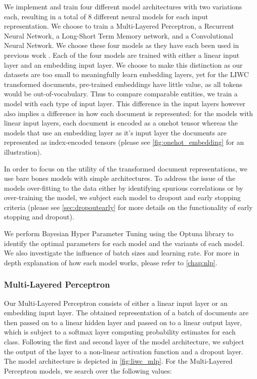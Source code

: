 We implement and train four different model architectures with two variations each, resulting in a total of 8 different neural models for each input representation. We choose to train a Multi-Layered Perceptron, a Recurrent Neural Network, a Long-Short Term Memory network, and a Convolutional Neural Network. We choose these four models as they have each been used in previous work \cite{CITE: Find papers with Neural approaches for each of the models}. Each of the four models are trained with either a linear input layer and an embedding input layer. We choose to make this distinction as our datasets are too small to meaningfully learn embedding layers, yet for the LIWC transformed documents, pre-trained embeddings have little value, as all tokens would be out-of-vocabulary. Thus to compare comparable entities, we train a model with each type of input layer. This difference in the input layers however also implies a difference in how each document is represented: for the models with linear input layers, each document is encoded as a onehot tensor whereas the models that use an embedding layer as it's input layer the documents are represented as index-encoded tensors (please see \autoref{fig:onehot_embedding} for an illustration).

In order to focus on the utility of the transformed document representations, we use bare bones models with simple architectures. To address the issue of the models over-fitting to the data either by identifying spurious correlations or by over-training the model, we subject each model to dropout and early stopping criteria (please see \autoref{sec:dropoutearly} for more details on the functionality of early stopping and dropout).

We perform Bayesian Hyper Parameter Tuning using the Optuna library \cite{CITE: Optuna} to identify the optimal parameters for each model and the variants of each model. We also investigate the influence of batch sizes and learning rate. For more in depth explanation of how each model works, please refer to \autoref{chap:nlp}.

\subsubsection{Multi-Layered Perceptron}

Our Multi-Layered Perceptron consists of either a linear input layer or an embedding input layer. The obtained representation of a batch of documents are then passed on to a linear hidden layer and passed on to a linear output layer, which is subject to a softmax layer computing probability estimates for each class. Following the first and second layer of the model architecture, we subject the output of the layer to a non-linear activation function and a dropout layer. The model architecture is depicted in \autoref{fig:liwc_mlp}. For the Multi-Layered Perceptron models, we search over the following values:

